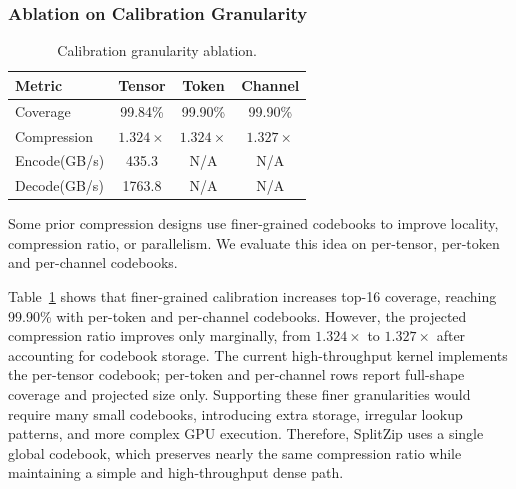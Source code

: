 \subsubsection{Ablation on Calibration Granularity}
\label{sec:ablation_granularity}

\begin{table}
    \vspace{-1.6em}
    \centering
    \caption{Calibration granularity ablation.}
    \label{tab:ablation_granularity}
    \scriptsize
    \setlength{\tabcolsep}{5pt}
    \renewcommand{\arraystretch}{1.02}
    \begin{tabular}{lccc}
        \toprule
        \textbf{Metric} & \textbf{Tensor} & \textbf{Token} & \textbf{Channel} \\
        \midrule
        Coverage & 99.84\% & 99.90\% & 99.90\% \\
        Compression & $1.324\times$ & $1.324\times$ & $1.327\times$ \\
        Encode(GB/s) & 435.3 & N/A & N/A \\
        Decode(GB/s) & 1763.8 & N/A & N/A \\
        \bottomrule
    \end{tabular}
    \vspace{-1.0em}
\end{table}

Some prior compression designs use finer-grained codebooks to improve locality, compression ratio, or parallelism.
We evaluate this idea on per-tensor, per-token and per-channel codebooks.

Table~\ref{tab:ablation_granularity} shows that finer-grained calibration increases top-16 coverage, reaching 99.90\% with per-token and per-channel codebooks.
However, the projected compression ratio improves only marginally, from $1.324\times$ to $1.327\times$ after accounting for codebook storage.
The current high-throughput kernel implements the per-tensor codebook; per-token and per-channel rows report full-shape coverage and projected size only.
Supporting these finer granularities would require many small codebooks, introducing extra storage, irregular lookup patterns, and more complex GPU execution.
Therefore, SplitZip uses a single global codebook, which preserves nearly the same compression ratio while maintaining a simple and high-throughput dense path.
